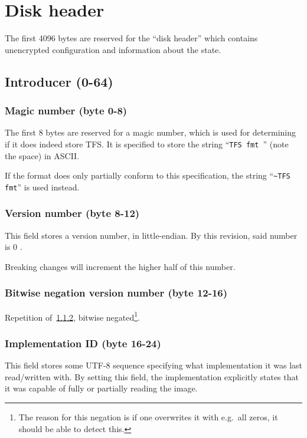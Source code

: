 \documentclass[11pt,a4paper]{report}
\newcommand{\clustersize}{4096 }
\newcommand{\versionnumber}{0 }
\begin{document}
    \chapter{Disk header}
    The first \clustersize bytes are reserved for the ``disk header'' which
    contains unencrypted configuration and information about the state.

    \section{Introducer (0-64)}
        \subsection{Magic number (byte 0-8)}
        The first 8 bytes are reserved for a magic number, which is used for
        determining if it does indeed store TFS\@. It is specified to store the
        string ``\texttt{TFS fmt }'' (note the space) in ASCII.

        If the format does only partially conform to this specification, the
        string ``\texttt{\textasciitilde TFS fmt}'' is used instead.

        \subsection{Version number (byte 8-12)}
        \label{header:versionnumber}
        This field stores a version number, in little-endian. By this revision,
        said number is \versionnumber.

        Breaking changes will increment the higher half of this number.

        \subsection{Bitwise negation version number (byte 12-16)}
        Repetition of~\ref{header:versionnumber}, bitwise
        negated\footnote{The reason for this negation is if one overwrites it
        with e.g.\ all zeros, it should be able to detect this.}.

        \subsection{Implementation ID (byte 16-24)}
        \label{header:implementationid}
        This field stores some UTF-8 sequence specifying what implementation it
        was last read/written with. By setting this field, the implementation
        explicitly states that it was capable of fully or partially reading the
        image.
\end{document}
